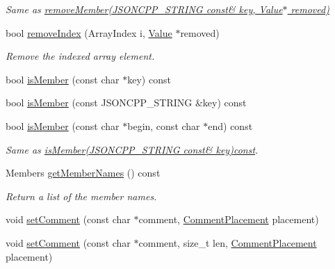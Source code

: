 \begin{DoxyCompactItemize}
\begin{DoxyCompactList}\small\item\em Same as \hyperlink{class_json_1_1_value_ae385ecef98427970df525ee876e9f54a}{remove\+Member(\+J\+S\+O\+N\+C\+P\+P\+\_\+\+S\+T\+R\+I\+N\+G const\& key, Value$\ast$ removed)} \end{DoxyCompactList}\item 
bool \hyperlink{class_json_1_1_value_ae9e67e08a85a2f3be3396ec0f4c47f65}{remove\+Index} (Array\+Index i, \hyperlink{class_json_1_1_value}{Value} $\ast$removed)
\begin{DoxyCompactList}\small\item\em Remove the indexed array element. \end{DoxyCompactList}\item 
bool \hyperlink{class_json_1_1_value_a196defba501d70ea2b6793afb04108e3}{is\+Member} (const char $\ast$key) const 
\item 
bool \hyperlink{class_json_1_1_value_ab68c6bcc59930e517495013394c93c83}{is\+Member} (const J\+S\+O\+N\+C\+P\+P\+\_\+\+S\+T\+R\+I\+NG \&key) const 
\item 
bool \hyperlink{class_json_1_1_value_a077604b87a79d75543a1b5438eb9d8ab}{is\+Member} (const char $\ast$begin, const char $\ast$end) const \hypertarget{class_json_1_1_value_a077604b87a79d75543a1b5438eb9d8ab}{}\label{class_json_1_1_value_a077604b87a79d75543a1b5438eb9d8ab}

\begin{DoxyCompactList}\small\item\em Same as \hyperlink{class_json_1_1_value_ab68c6bcc59930e517495013394c93c83}{is\+Member(\+J\+S\+O\+N\+C\+P\+P\+\_\+\+S\+T\+R\+I\+N\+G const\& key)const}. \end{DoxyCompactList}\item 
Members \hyperlink{class_json_1_1_value_a30fa08af88f2d0a038b22ba9f4e88b2a}{get\+Member\+Names} () const 
\begin{DoxyCompactList}\small\item\em Return a list of the member names. \end{DoxyCompactList}\item 
void \hyperlink{class_json_1_1_value_a29f3a30f7e5d3af6f38d57999bf5b480}{set\+Comment} (const char $\ast$comment, \hyperlink{namespace_json_a4fc417c23905b2ae9e2c47d197a45351}{Comment\+Placement} placement)
\item 
void \hyperlink{class_json_1_1_value_a2900152a2887b410a9ddabe278b9d492}{set\+Comment} (const char $\ast$comment, size\+\_\+t len, \hyperlink{namespace_json_a4fc417c23905b2ae9e2c47d197a45351}{Comment\+Placement} placement)\hypertarget{class_json_1_1_value_a2900152a2887b410a9ddabe278b9d492}{}\label{class_json_1_1_value_a2900152a2887b410a9ddabe278b9d492}


\end{DoxyCompactItemize}
